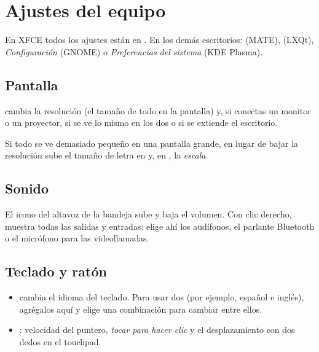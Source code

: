 \chapter{Ajustes del equipo}\label{cap:14-ajustes}

En XFCE todos los ajustes están en . En los demás escritorios:  (MATE),  (LXQt),
\emph{Configuración} (GNOME) o \emph{Preferencias del sistema} (KDE
Plasma).


\section{Pantalla}

 cambia la resolución (el tamaño de todo en
la pantalla) y, si conectas un monitor o un proyector, si se ve lo mismo
en los dos o si se extiende el escritorio.

\begin{consejo}
Si todo se ve demasiado pequeño en una pantalla grande, en lugar de bajar
la resolución sube el tamaño de letra en  y, en , la \emph{escala}.
\end{consejo}

\section{Sonido}

El icono del altavoz de la bandeja sube y baja el volumen. Con clic
derecho,  muestra todas las salidas y
entradas: elige ahí los audífonos, el parlante Bluetooth o el micrófono
para las videollamadas.

\section{Teclado y ratón}

\begin{itemize}
  \item {} cambia el idioma del
        teclado. Para usar dos (por ejemplo, español e inglés), agrégalos
        aquí y elige una combinación para cambiar entre ellos.
  \item {}: velocidad del puntero,
        \emph{tocar para hacer clic} y el desplazamiento con dos dedos en el
        touchpad.
\end{itemize}

